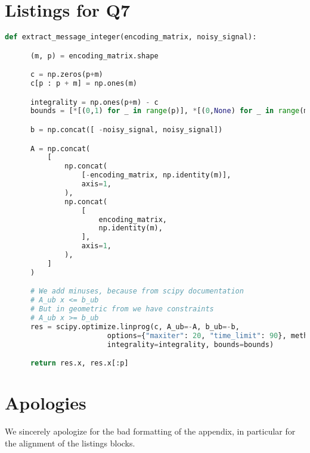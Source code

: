 \documentclass{article}
\begin{document}
\section{Listings for Q7}
\begin{minipage}{\linewidth}
  \begin{lstlisting}[language=Python, caption={Message decryption based on solution of integer LOP in geometric form. The output is tuple of solution of the problem and decrypted message itself}, label={lst:int}]
  def extract_message_integer(encoding_matrix, noisy_signal):

      (m, p) = encoding_matrix.shape

      c = np.zeros(p+m)
      c[p : p + m] = np.ones(m)

      integrality = np.ones(p+m) - c
      bounds = [*[(0,1) for _ in range(p)], *[(0,None) for _ in range(m)]]

      b = np.concat([ -noisy_signal, noisy_signal])

      A = np.concat(
          [
              np.concat(
                  [-encoding_matrix, np.identity(m)],
                  axis=1,
              ),
              np.concat(
                  [
                      encoding_matrix,
                      np.identity(m),
                  ],
                  axis=1,
              ),
          ]
      )

      # We add minuses, because from scipy documentation
      # A_ub x <= b_ub
      # But in geometric from we have constraints
      # A_ub x >= b_ub
      res = scipy.optimize.linprog(c, A_ub=-A, b_ub=-b,
                        options={"maxiter": 20, "time_limit": 90}, method="highs",
                        integrality=integrality, bounds=bounds)

      return res.x, res.x[:p]
\end{lstlisting}
\end{minipage}

\section{Apologies}
We sincerely apologize for the bad formatting of the appendix, in particular for the alignment of the listings blocks.
\end{document}
